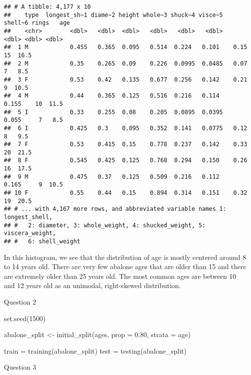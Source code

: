 \documentclass[
]{article}
\newenvironment{Shaded}{\begin{snugshade}}{\end{snugshade}}
\newcommand{\AttributeTok}[1]{\textcolor[rgb]{0.77,0.63,0.00}{#1}}
\newcommand{\DecValTok}[1]{\textcolor[rgb]{0.00,0.00,0.81}{#1}}
\newcommand{\FloatTok}[1]{\textcolor[rgb]{0.00,0.00,0.81}{#1}}
\newcommand{\FunctionTok}[1]{\textcolor[rgb]{0.00,0.00,0.00}{#1}}
\newcommand{\NormalTok}[1]{#1}
\newcommand{\OtherTok}[1]{\textcolor[rgb]{0.56,0.35,0.01}{#1}}
\begin{document}
\begin{verbatim}
## # A tibble: 4,177 x 10
##    type  longest_sh~1 diame~2 height whole~3 shuck~4 visce~5 shell~6 rings   age
##    <chr>        <dbl>   <dbl>  <dbl>   <dbl>   <dbl>   <dbl>   <dbl> <dbl> <dbl>
##  1 M            0.455   0.365  0.095   0.514  0.224   0.101    0.15     15  16.5
##  2 M            0.35    0.265  0.09    0.226  0.0995  0.0485   0.07      7   8.5
##  3 F            0.53    0.42   0.135   0.677  0.256   0.142    0.21      9  10.5
##  4 M            0.44    0.365  0.125   0.516  0.216   0.114    0.155    10  11.5
##  5 I            0.33    0.255  0.08    0.205  0.0895  0.0395   0.055     7   8.5
##  6 I            0.425   0.3    0.095   0.352  0.141   0.0775   0.12      8   9.5
##  7 F            0.53    0.415  0.15    0.778  0.237   0.142    0.33     20  21.5
##  8 F            0.545   0.425  0.125   0.768  0.294   0.150    0.26     16  17.5
##  9 M            0.475   0.37   0.125   0.509  0.216   0.112    0.165     9  10.5
## 10 F            0.55    0.44   0.15    0.894  0.314   0.151    0.32     19  20.5
## # ... with 4,167 more rows, and abbreviated variable names 1: longest_shell,
## #   2: diameter, 3: whole_weight, 4: shucked_weight, 5: viscera_weight,
## #   6: shell_weight
\end{verbatim}

In this histogram, we see that the distribution of age is mostly
centered around 8 to 14 years old. There are very few abalone ages that
are older than 15 and there are extremely older than 25 years old. The
most common ages are between 10 and 12 years old as an unimodal,
right-skewed distribution.

Question 2

\begin{Shaded}
\begin{Highlighting}[]
\FunctionTok{set.seed}\NormalTok{(}\DecValTok{1500}\NormalTok{)}

\NormalTok{abalone\_split }\OtherTok{\textless{}{-}} \FunctionTok{initial\_split}\NormalTok{(ages, }\AttributeTok{prop =} \FloatTok{0.80}\NormalTok{, }
                               \AttributeTok{strata =}\NormalTok{ age)}

\NormalTok{train }\OtherTok{=} \FunctionTok{training}\NormalTok{(abalone\_split)}
\NormalTok{test }\OtherTok{=} \FunctionTok{testing}\NormalTok{(abalone\_split)}
\end{Highlighting}
\end{Shaded}

Question 3
\end{document}
